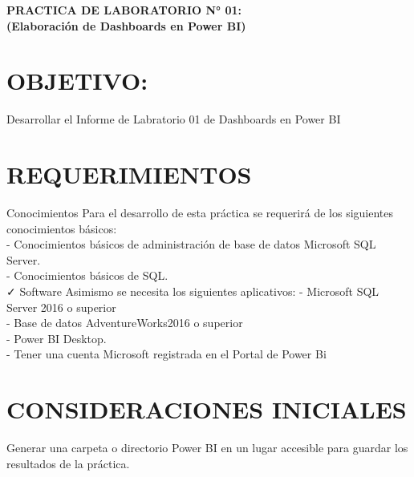 \begin{center}
\vspace*{0.1in}
\begin{Large}
\textbf{PRACTICA DE LABORATORIO N° 01:} \\
\textbf{(Elaboración de Dashboards en Power BI)} \\
\end{Large}
\end{center}

\section{OBJETIVO:}
\item{
Desarrollar el Informe de Labratorio 01 de Dashboards en Power BI}
\section{REQUERIMIENTOS}
\item{Conocimientos
Para el desarrollo de esta práctica se requerirá de los siguientes conocimientos básicos:\\
- Conocimientos básicos de administración de base de datos Microsoft SQL Server.\\
- Conocimientos básicos de SQL.\\
✓ Software
Asimismo se necesita los siguientes aplicativos:
- Microsoft SQL Server 2016 o superior\\
- Base de datos AdventureWorks2016 o superior\\
- Power BI Desktop.\\
- Tener una cuenta Microsoft registrada en el Portal de Power Bi}\\

\section{CONSIDERACIONES INICIALES}
\item{Generar una carpeta o directorio Power BI en un lugar accesible para guardar los resultados de la práctica.}\\
\\\\\\\\\\\\\\\\\\\\\\\\\\\\
